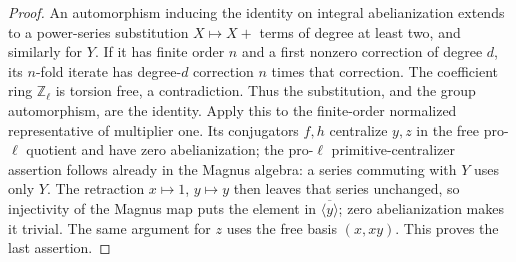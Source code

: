 \begin{proof}
An automorphism inducing the identity on integral
abelianization extends to a power-series substitution
$X\mapsto X+$ terms of degree at least two, and similarly
for $Y$. If it has finite order $n$ and a first nonzero
correction of degree $d$, its $n$-fold iterate has degree-$d$
correction $n$ times that correction. The coefficient ring
$\mathbb Z_\ell$ is torsion free, a contradiction. Thus the
substitution, and the group automorphism, are the identity.
Apply this to the finite-order normalized representative
of multiplier one. Its conjugators $f,h$ centralize $y,z$
in the free pro-$\ell$ quotient and have zero abelianization;
the pro-$\ell$ primitive-centralizer assertion follows
already in the Magnus algebra: a series commuting with
$Y$ uses only $Y$. The retraction $x\mapsto1$, $y\mapsto y$
then leaves that series unchanged, so injectivity of the
Magnus map puts the element in $\overline{\langle y\rangle}$;
zero abelianization makes it trivial. The same argument
for $z$ uses the free basis $(x,xy)$. This proves the last
assertion.
\end{proof}

